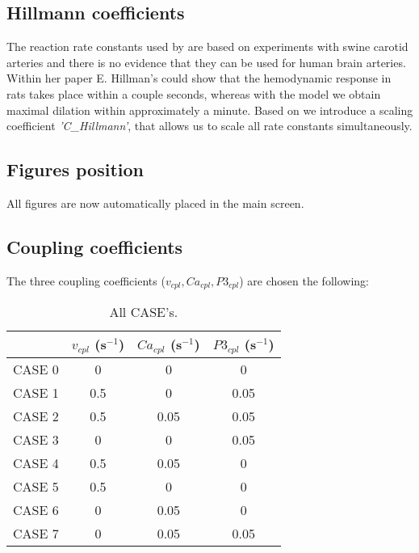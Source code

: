 \subsection{Hillmann coefficients}
The reaction rate constants used by \citep{Hai1988} are based on experiments with swine carotid arteries and there is no evidence that they can be used for human brain arteries. Within her paper \citep{Hillman2011} E. Hillman's  could show that the hemodynamic response in rats takes place within a couple seconds, whereas with the \citep{Hai1988} model we obtain maximal dilation within approximately a minute. Based on \citep{Hillman2011} we introduce a scaling coefficient \textit{'C\_Hillmann'}, that allows us to scale all rate constants simultaneously. 

\subsection{Figures position} 
All figures are now automatically placed in the main screen. 

\subsection{Coupling coefficients}
The three coupling coefficients ($v_{cpl}, Ca_{cpl}, P3_{cpl}$) are chosen the following:

\begin{table}[h!]
\centering
\caption{All CASE's.}
\begin{tabular}{c c c c}
\hline
       & $v_{cpl}$ (s$^{-1}$) & $Ca_{cpl}$ (s$^{-1}$)& $P3_{cpl}$ (s$^{-1}$)\\
       \hline \hline
CASE 0 & 0     & 0     & 0     \\
CASE 1 & 0.5   & 0     & 0.05  \\
CASE 2 & 0.5   & 0.05  & 0.05  \\
CASE 3 & 0     & 0     & 0.05  \\
CASE 4 & 0.5   & 0.05  & 0     \\
CASE 5 & 0.5   & 0     & 0     \\
CASE 6 & 0     & 0.05  & 0     \\
CASE 7 & 0     & 0.05  & 0.05  \\
\hline
\end{tabular}
\end{table}

